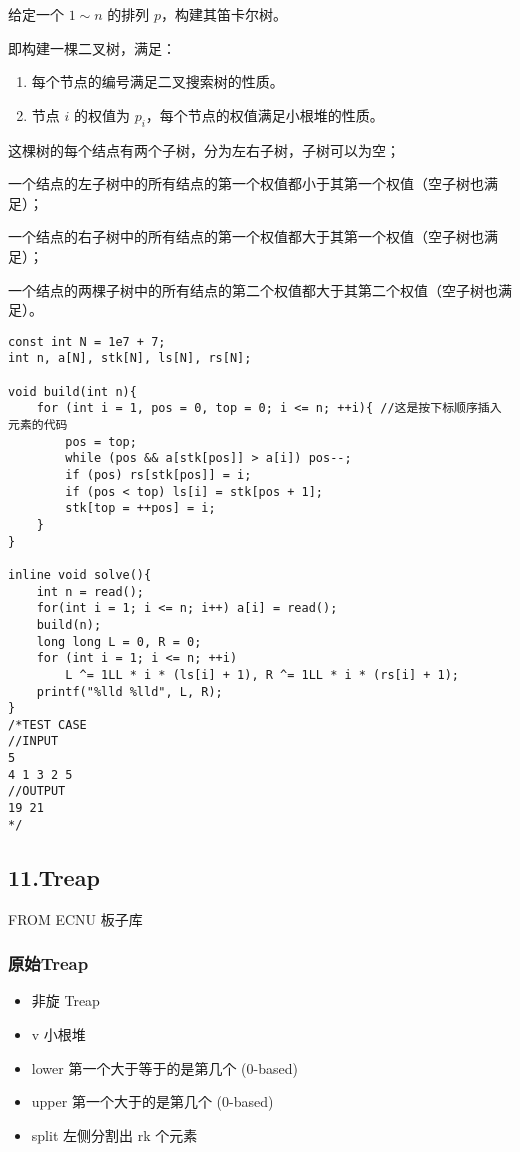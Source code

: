 \documentclass[]{article}
\providecommand{\tightlist}{%
  \setlength{\itemsep}{0pt}\setlength{\parskip}{0pt}}
\begin{document}
给定一个 \(1 \sim n\) 的排列 \(p\)，构建其笛卡尔树。

即构建一棵二叉树，满足：

\begin{enumerate}
\def\labelenumi{\arabic{enumi}.}
\tightlist
\item
  每个节点的编号满足二叉搜索树的性质。
\item
  节点 \(i\) 的权值为 \(p_i\)，每个节点的权值满足小根堆的性质。
\end{enumerate}

这棵树的每个结点有两个子树，分为左右子树，子树可以为空；

一个结点的左子树中的所有结点的第一个权值都小于其第一个权值（空子树也满足）；

一个结点的右子树中的所有结点的第一个权值都大于其第一个权值（空子树也满足）；

一个结点的两棵子树中的所有结点的第二个权值都大于其第二个权值（空子树也满足）。

\begin{verbatim}
const int N = 1e7 + 7;
int n, a[N], stk[N], ls[N], rs[N];

void build(int n){
    for (int i = 1, pos = 0, top = 0; i <= n; ++i){ //这是按下标顺序插入元素的代码
        pos = top;
        while (pos && a[stk[pos]] > a[i]) pos--;
        if (pos) rs[stk[pos]] = i;
        if (pos < top) ls[i] = stk[pos + 1];
        stk[top = ++pos] = i;
    }
}

inline void solve(){
    int n = read();
    for(int i = 1; i <= n; i++) a[i] = read();
    build(n);
    long long L = 0, R = 0;
    for (int i = 1; i <= n; ++i)
        L ^= 1LL * i * (ls[i] + 1), R ^= 1LL * i * (rs[i] + 1);
    printf("%lld %lld", L, R);
}
/*TEST CASE
//INPUT
5
4 1 3 2 5
//OUTPUT
19 21
*/
\end{verbatim}

\hypertarget{treap}{%
\subsection{11.Treap}\label{treap}}

FROM ECNU 板子库

\hypertarget{ux539fux59cbtreap}{%
\subsubsection{原始Treap}\label{ux539fux59cbtreap}}

\begin{itemize}
\tightlist
\item
  非旋 Treap
\item
  v 小根堆
\item
  lower 第一个大于等于的是第几个 (0-based)
\item
  upper 第一个大于的是第几个 (0-based)
\item
  split 左侧分割出 rk 个元素
\end{itemize}
\end{document}
